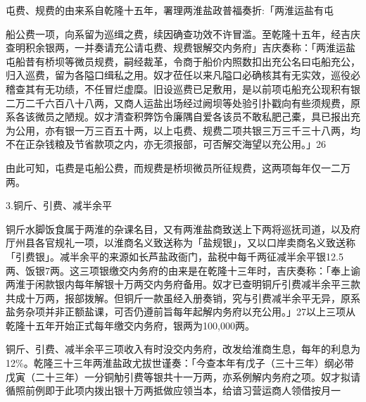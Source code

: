 屯费、规费的由来系自乾隆十五年，署理两淮盐政普福奏折:「两淮运盐有屯

\vfill
\begin{BookNotes}
\end{BookNotes}

\noindent 船公费一项，向系留为巡缉之费，续因确查功效不许冒滥。至乾隆十五年，经吉庆查明积余银两，一并奏请充公请屯费、规费银解交内务府」吉庆奏称：「两淮运盐屯船昔有桥坝等微员规费，嗣经裁革，令商于船价内照数扣出充公名曰屯船充公，归入巡费，留为各隘口缉私之用。奴才莅任以来凡隘口必确核其有无实效，巡役必稽查其有无功绩，不任冒烂虚糜。旧设巡费已足敷用，是以前项屯船充公现积有银二万二千六百八十八两，又商人运盐出场经过阙坝等处验引扑戳向有些须规费，原系各该微员之陋规。奴才清查积弊饬令廉隅自爱各该员不敢私肥己橐，具已报出充为公用，亦有银一万三百五十两，以上屯费、规费二项共银三万三千三十八两，均不在正杂钱粮及节省款项之内，亦无须报部，可否解交海望以充公用。」26

由此可知，屯费是屯船公费，而规费是桥坝微员所征规费，这两项每年仅一二万两。

3.铜斤、引费、减半余平

铜斤水脚饭食属于两淮的杂课名目，又有两淮盐商致送上下两将巡抚司道，以及府厅州县各官规礼一项，以淮商名义致送称为「盐规银」，又以口岸卖商名义致送称「引费银」。减半余平的来源如长芦盐政衙门，盐税中每千两征减半余平银12.5两、饭银7两。这三项银缴交内务府的由来是在乾隆十三年时，吉庆奏称：「奉上谕两淮于闲款银内每年解银十万两交内务府备用。奴才已查明铜斤引费减半余平三款共成十万两，报部拨解。但铜斤一款虽经入册奏销，究与引费减半余平无异，原系盐务杂项并非正额盐课，可否仍遵前旨每年起解内务府以充公用。」27以上三项从乾隆十五年开始正式每年缴交内务府，银两为100,000两。

铜斤、引费、减半余平三项收入有时没交内务府，改发给淮商生息，每年的利息为12\%。乾隆三十三年两淮盐政尤拔世谨奏：「今查本年有戊子（三十三年）纲必带戊寅（二十三年）一分铜觔引费等银共十一万两，亦系例解内务府之项。奴才拟请循照前例即于此项内拨出银十万两抵做应领当本，给谙习营运商人领借按月一

\vfill
\begin{BookNotes}
\end{BookNotes}

